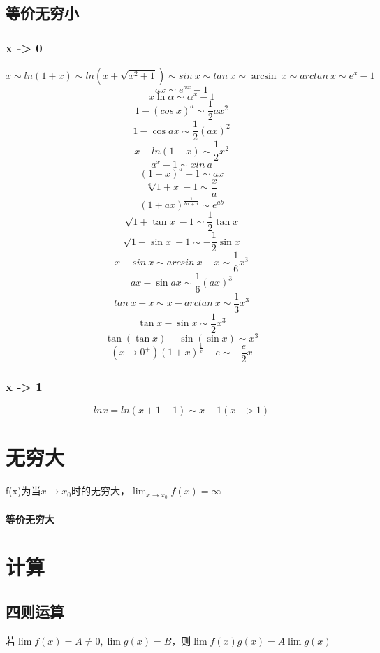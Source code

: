 \subsection{等价无穷小}

\subsubsection{x -> 0}
\[x \sim ln(1 + x) \sim ln(x + \sqrt{x^2 + 1}) \sim sin\ x \sim tan\ x \sim \arcsin\ x \sim arctan\ x \sim e^x - 1\]
\[ax \sim e^{ax} - 1\]
\[x\ln\alpha \sim \alpha^x - 1\]
\[1 - (cos\ x)^a \sim \frac{1}{2}ax^2\]
\[1 - \cos ax \sim \dfrac{1}{2}(ax)^2\]
\[x - ln(1 + x) \sim \frac{1}{2}x^2\]
\[a^x - 1 \sim xln\ a\]
\[(1 + x)^a - 1 \sim ax\]
\[\sqrt[a]{1 + x} - 1 \sim \frac{x}{a}\]
\[(1 + ax)^{\frac{1}{bx + d}} \sim e^{ab}\]
\[\sqrt{1 + \tan x} - 1 \sim \dfrac{1}{2}\tan x\]
\[\sqrt{1 - \sin x} - 1 \sim -\dfrac{1}{2}\sin x\]
\[x - sin\ x \sim arcsin\ x - x \sim \dfrac{1}{6}x^3\]
\[ax - \sin ax \sim \dfrac{1}{6}(ax)^3\]
\[tan\ x - x \sim x - arctan\ x \sim \dfrac{1}{3}x^3\]
\[\tan x - \sin x \sim \dfrac{1}{2}x^3\]
\[\tan(\tan x) - \sin(\sin x) \sim x^3\]
\[(x \to 0^+)(1 + x)^{\frac{1}{x}} - e \sim -\frac{e}{2}x\]

\subsubsection{x -> 1}
\begin{displaymath}
lnx = ln(x + 1 - 1) \sim x - 1 (x->1)
\end{displaymath}

\section{无穷大}
f(x)为当\(x \to x_0\)时的无穷大，\(\displaystyle \lim_{x \to x_0}f(x) = \infty\)


\paragraph{等价无穷大}




\section{计算}

\subsection{四则运算}
若\(\lim f(x) = A \neq 0, \lim g(x) = B\)，则\(\lim f(x)g(x) = A\lim g(x)\)

